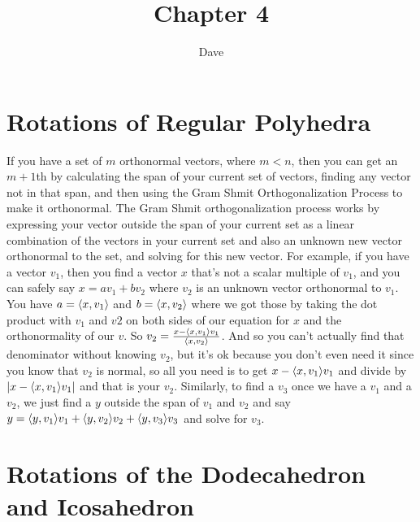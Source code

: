\documentclass[11pt, oneside]{article}   	%
\title{Chapter 4}
\author{Dave}
\begin{document}
\maketitle

\section{Rotations of Regular Polyhedra}
\be
\item \be
\item If you have a set of $m$ orthonormal vectors, where $m < n$, then you can get an $m+1$th by calculating the span of your current set of vectors, finding any vector not in that span, and then using the Gram Shmit Orthogonalization Process to make it orthonormal. The Gram Shmit orthogonalization process works by expressing your vector outside the span of your current set as a linear combination of the vectors in your current set and also an unknown new vector orthonormal to the set, and solving for this new vector. For example, if you have a vector $v_1$, then you find a vector $x$ that's not a scalar multiple of $v_1$, and you can safely say $x = a v_1 + bv_2$ where $v_2$ is an unknown vector orthonormal to $v_1$. You have $a = \langle x, v_1 \rangle$ and $b = \langle x, v_2 \rangle$ where we got those by taking the dot product with $v_1$ and $v2$ on both sides of our equation for $x$ and the orthonormality of our $v$. So $v_2 = \frac{x - \langle x, v_1 \rangle v_1}{\langle x, v_2 \rangle}$. And so you can't actually find that denominator without knowing $v_2$, but it's ok because you don't even need it since you know that $v_2$ is normal, so all you need is to get $x - \langle x, v_1 \rangle v_1$ and divide by $|x - \langle x, v_1 \rangle v_1|$ and that is your $v_2$. Similarly, to find a $v_3$ once we have a $v_1$ and a $v_2$, we just find a $y$ outside the span of $v_1$ and $v_2$ and say $y = \langle y, v_1 \rangle v_1 + \langle y, v_2 \rangle v_2 + \langle y, v_3 \rangle v_3$ and solve for $v_3$. 
\item
\item
\ee
\item 
\item 
\item 
\item 
\item 
\item 
\item
\ee 
\section{Rotations of the Dodecahedron and Icosahedron}
\be
\item 
\item 
\item 
\ee
\end{document}
